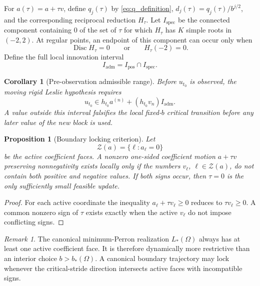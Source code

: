 \documentclass[11pt]{amsart}
\numberwithin{equation}{section}
\theoremstyle{plain}
\newtheorem{proposition}[theorem]{Proposition}
\newtheorem{corollary}[theorem]{Corollary}
\theoremstyle{definition}
\theoremstyle{remark}
\newtheorem{remark}[theorem]{Remark}
\begin{document}
For $a(\tau)=a+\tau v$, define $q_j(\tau)$ by \eqref{eq:q_definition}, $d_j(\tau)=q_j(\tau)/b^{j/2}$, and the corresponding reciprocal reduction $H_\tau$.  Let $I_{\mathrm{spec}}$ be the connected component containing $0$ of the set of $\tau$ for which $H_\tau$ has $K$ simple roots in $(-2,2)$.  At regular points, an endpoint of this component can occur only when
\begin{equation}
\operatorname{Disc}H_\tau=0
\qquad\text{or}\qquad
H_\tau(-2)=0.
\label{eq:tau_spectral_boundaries}
\end{equation}
Define the full local innovation interval
\begin{equation}
I_{\mathrm{adm}}=I_{\mathrm{pos}}\cap I_{\mathrm{spec}}.
\label{eq:admissible_tau_interval}
\end{equation}

\begin{corollary}[Pre-observation admissible range]
\label{cor:first_value_admissible_range}
Before $u_{t_0}$ is observed, the moving rigid Leslie hypothesis requires
\begin{equation}
\boxed{
 u_{t_0}
 \in
 h_{t_0}a^{(n)}
 +(h_{t_0}v_n)I_{\mathrm{adm}}.
}
\label{eq:first_value_allowed_interval}
\end{equation}
A value outside this interval falsifies the local fixed-$b$ critical transition before any later value of the new block is used.
\end{corollary}

\begin{proposition}[Boundary locking criterion]
\label{prop:boundary_locking}
Let
\begin{equation}
\mathcal Z(a)=\{\ell:a_\ell=0\}
\label{eq:active_zero_set}
\end{equation}
be the active coefficient faces.  A nonzero one-sided coefficient motion $a+\tau v$ preserving nonnegativity exists locally only if the numbers $v_\ell$, $\ell\in\mathcal Z(a)$, do not contain both positive and negative values.  If both signs occur, then $\tau=0$ is the only sufficiently small feasible update.
\end{proposition}

\begin{proof}
For each active coordinate the inequality $a_\ell+\tau v_\ell\geq0$ reduces to $\tau v_\ell\geq0$.  A common nonzero sign of $\tau$ exists exactly when the active $v_\ell$ do not impose conflicting signs.
\end{proof}

\begin{remark}
\label{rem:minimum_perron_locking}
The canonical minimum-Perron realization $L_*(\Omega)$ always has at least one active coefficient face.  It is therefore dynamically more restrictive than an interior choice $b>b_*(\Omega)$.  A canonical boundary trajectory may lock whenever the critical-stride direction intersects active faces with incompatible signs.
\end{remark}
\end{document}
